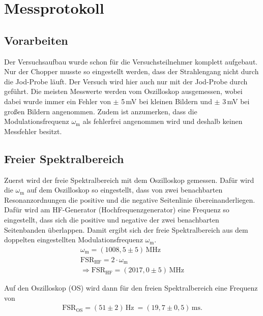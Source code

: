 
\def\skalierung{0.65}

\chapter{Messprotokoll}
\label{chap:protokoll}

\section{Vorarbeiten}
\label{sec:vorarbeit}

Der Versuchsaufbau wurde schon für die Versuchsteilnehmer komplett aufgebaut. Nur der Chopper musste so eingestellt werden, dass der Strahlengang nicht durch die Jod-Probe läuft. Der Versuch wird hier auch nur mit der Jod-Probe durch geführt. Die meisten Messwerte werden vom Oszilloskop ausgemessen, wobei dabei wurde immer ein Fehler von $\pm$ 5\,mV bei kleinen Bildern und $\pm$ 3\,mV bei großen Bildern angenommen. Zudem ist anzumerken, dass die Modulationsfrequenz $\omega_\mathrm{m}$ als fehlerfrei angenommen wird und deshalb keinen Messfehler besitzt.

\section{Freier Spektralbereich}
\label{sec:specBereich}

Zuerst wird der freie Spektralbereich mit dem Oszilloskop gemessen. Dafür wird die $\omega_\mathrm{m}$ auf dem Oszilloskop so eingestellt, dass von zwei benachbarten Resonanzordnungen die positive und die negative Seitenlinie übereinanderliegen. Dafür wird am HF-Generator (Hochfrequenzgenerator) eine Frequenz so eingestellt, dass sich die positive und negative der zwei benachbarten Seitenbanden überlappen. Damit ergibt sich der freie Spektralbereich aus dem doppelten eingestellten Modulationsfrequenz $\omega_\mathrm{m}$. 
\begin{gather}
    \omega_\mathrm{m} = ( 1008,5 \pm 5 )\,\mathrm{MHz} \\
    \mathrm{FSR}_\mathrm{HF} = 2 \cdot \omega_\mathrm{m} \\
    \Rightarrow \boxed{\mathrm{FSR}_\mathrm{HF} = ( 2017,0 \pm 5 )\,\mathrm{MHz}}
\end{gather}

Auf den Oszilloskop (OS) wird dann für den freien Spektralbereich eine Frequenz von 
\begin{gather}
    \boxed{\mathrm{FSR}_\mathrm{OS} = (51 \pm 2)\,\mathrm{Hz}~ = (19,7 \pm 0,5)\,\mathrm{ms}.}
\end{gather}

